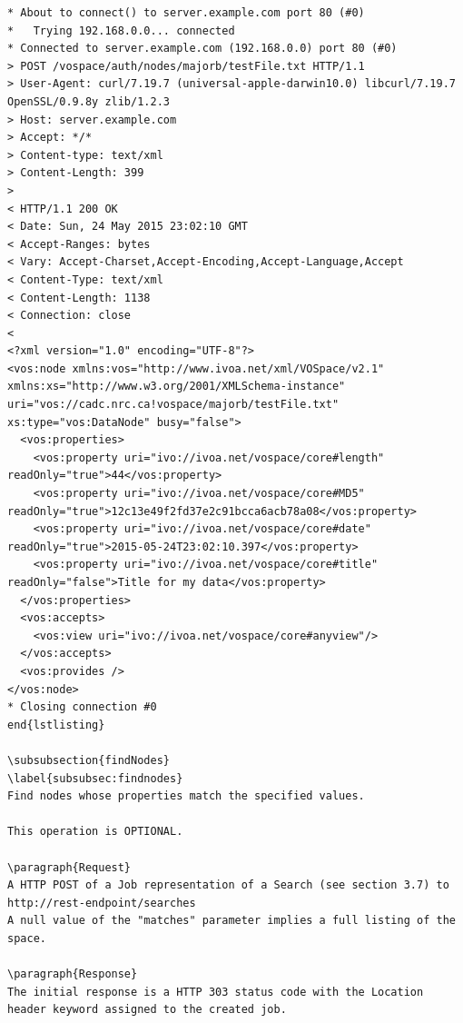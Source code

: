 \documentclass[11pt,a4paper]{ivoa}
\begin{document}
\begin{lstlisting}
* About to connect() to server.example.com port 80 (#0)
*   Trying 192.168.0.0... connected
* Connected to server.example.com (192.168.0.0) port 80 (#0)
> POST /vospace/auth/nodes/majorb/testFile.txt HTTP/1.1
> User-Agent: curl/7.19.7 (universal-apple-darwin10.0) libcurl/7.19.7 OpenSSL/0.9.8y zlib/1.2.3
> Host: server.example.com
> Accept: */*
> Content-type: text/xml
> Content-Length: 399
>
< HTTP/1.1 200 OK
< Date: Sun, 24 May 2015 23:02:10 GMT
< Accept-Ranges: bytes
< Vary: Accept-Charset,Accept-Encoding,Accept-Language,Accept
< Content-Type: text/xml
< Content-Length: 1138
< Connection: close
<
<?xml version="1.0" encoding="UTF-8"?>
<vos:node xmlns:vos="http://www.ivoa.net/xml/VOSpace/v2.1" xmlns:xs="http://www.w3.org/2001/XMLSchema-instance" uri="vos://cadc.nrc.ca!vospace/majorb/testFile.txt" xs:type="vos:DataNode" busy="false">
  <vos:properties>
    <vos:property uri="ivo://ivoa.net/vospace/core#length" readOnly="true">44</vos:property>
    <vos:property uri="ivo://ivoa.net/vospace/core#MD5" readOnly="true">12c13e49f2fd37e2c91bcca6acb78a08</vos:property>
    <vos:property uri="ivo://ivoa.net/vospace/core#date" readOnly="true">2015-05-24T23:02:10.397</vos:property>
    <vos:property uri="ivo://ivoa.net/vospace/core#title" readOnly="false">Title for my data</vos:property>
  </vos:properties>
  <vos:accepts>
    <vos:view uri="ivo://ivoa.net/vospace/core#anyview"/>
  </vos:accepts>
  <vos:provides />
</vos:node>
* Closing connection #0
end{lstlisting}

\subsubsection{findNodes}
\label{subsubsec:findnodes}
Find nodes whose properties match the specified values.

This operation is OPTIONAL.

\paragraph{Request}
A HTTP POST of a Job representation of a Search (see section 3.7) to http://rest-endpoint/searches
A null value of the "matches" parameter implies a full listing of the space.

\paragraph{Response}
The initial response is a HTTP 303 status code with the Location header keyword assigned to the created job.


\end{lstlisting}
\end{document}
